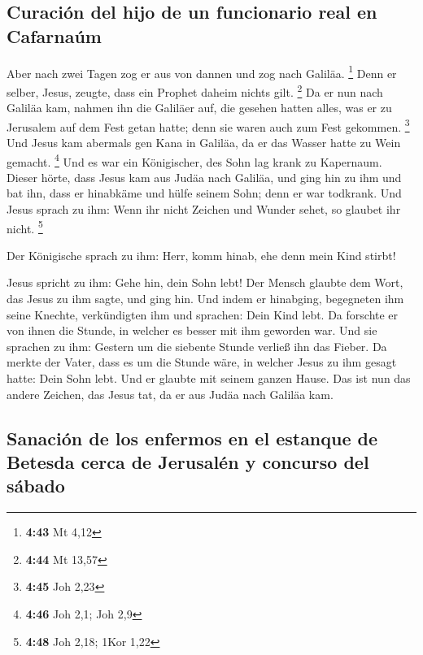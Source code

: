\hypertarget{curaciuxf3n-del-hijo-de-un-funcionario-real-en-cafarnauxfam}{%
\subsection{Curación del hijo de un funcionario real en
Cafarnaúm}\label{curaciuxf3n-del-hijo-de-un-funcionario-real-en-cafarnauxfam}}

 Aber nach zwei Tagen zog er aus von dannen und zog nach
Galiläa. \footnote{\textbf{4:43} Mt 4,12}  Denn er
selber, Jesus, zeugte, dass ein Prophet daheim nichts gilt. \footnote{\textbf{4:44}
  Mt 13,57}  Da er nun nach Galiläa kam, nahmen ihn die
Galiläer auf, die gesehen hatten alles, was er zu Jerusalem auf dem Fest
getan hatte; denn sie waren auch zum Fest gekommen. \footnote{\textbf{4:45}
  Joh 2,23}  Und Jesus kam abermals gen Kana in Galiläa,
da er das Wasser hatte zu Wein gemacht. \footnote{\textbf{4:46} Joh 2,1;
  Joh 2,9}  Und es war ein Königischer, des Sohn lag
krank zu Kapernaum. Dieser hörte, dass Jesus kam aus Judäa nach Galiläa,
und ging hin zu ihm und bat ihn, dass er hinabkäme und hülfe seinem
Sohn; denn er war todkrank.  Und Jesus sprach zu ihm:
Wenn ihr nicht Zeichen und Wunder sehet, so glaubet ihr nicht.
\footnote{\textbf{4:48} Joh 2,18; 1Kor 1,22}

 Der Königische sprach zu ihm: Herr, komm hinab, ehe denn
mein Kind stirbt!

 Jesus spricht zu ihm: Gehe hin, dein Sohn lebt! Der
Mensch glaubte dem Wort, das Jesus zu ihm sagte, und ging hin.
 Und indem er hinabging, begegneten ihm seine Knechte,
verkündigten ihm und sprachen: Dein Kind lebt.  Da
forschte er von ihnen die Stunde, in welcher es besser mit ihm geworden
war. Und sie sprachen zu ihm: Gestern um die siebente Stunde verließ ihn
das Fieber.  Da merkte der Vater, dass es um die Stunde
wäre, in welcher Jesus zu ihm gesagt hatte: Dein Sohn lebt. Und er
glaubte mit seinem ganzen Hause.  Das ist nun das andere
Zeichen, das Jesus tat, da er aus Judäa nach Galiläa kam.

\hypertarget{sanaciuxf3n-de-los-enfermos-en-el-estanque-de-betesda-cerca-de-jerusaluxe9n-y-concurso-del-suxe1bado}{%
\subsection{Sanación de los enfermos en el estanque de Betesda cerca de
Jerusalén y concurso del
sábado}\label{sanaciuxf3n-de-los-enfermos-en-el-estanque-de-betesda-cerca-de-jerusaluxe9n-y-concurso-del-suxe1bado}}

